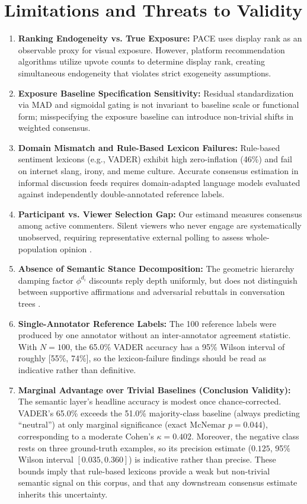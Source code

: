 \documentclass[journal]{IEEEtran}
\begin{document}
\section{Limitations and Threats to Validity}
\begin{enumerate}
    \item \textbf{Ranking Endogeneity vs. True Exposure:} PACE uses display rank as an observable proxy for visual exposure. However, platform recommendation algorithms utilize upvote counts to determine display rank, creating simultaneous endogeneity that violates strict exogeneity assumptions.
    \item \textbf{Exposure Baseline Specification Sensitivity:} Residual standardization via MAD and sigmoidal gating is not invariant to baseline scale or functional form; misspecifying the exposure baseline can introduce non-trivial shifts in weighted consensus.
    \item \textbf{Domain Mismatch and Rule-Based Lexicon Failures:} Rule-based sentiment lexicons (e.g., VADER) exhibit high zero-inflation (46\%) and fail on internet slang, irony, and meme culture. Accurate consensus estimation in informal discussion feeds requires domain-adapted language models evaluated against independently double-annotated reference labels.
    \item \textbf{Participant vs. Viewer Selection Gap:} Our estimand measures consensus among active commenters. Silent viewers who never engage are systematically unobserved, requiring representative external polling to assess whole-population opinion \cite{zhao2025spiral}.
    \item \textbf{Absence of Semantic Stance Decomposition:} The geometric hierarchy damping factor $\phi^{d_i}$ discounts reply depth uniformly, but does not distinguish between supportive affirmations and adversarial rebuttals in conversation trees \cite{zubiaga2016stance}.
    \item \textbf{Single-Annotator Reference Labels:} The 100 reference labels were produced by one annotator without an inter-annotator agreement statistic. With $N = 100$, the 65.0\% VADER accuracy has a 95\% Wilson interval of roughly [55\%, 74\%], so the lexicon-failure findings should be read as indicative rather than definitive.
    \item \textbf{Marginal Advantage over Trivial Baselines (Conclusion Validity):} The semantic layer's headline accuracy is modest once chance-corrected. VADER's 65.0\% exceeds the 51.0\% majority-class baseline (always predicting ``neutral'') at only marginal significance (exact McNemar $p = 0.044$), corresponding to a moderate Cohen's $\kappa = 0.402$. Moreover, the negative class rests on three ground-truth examples, so its precision estimate ($0.125$, 95\% Wilson interval $[0.035, 0.360]$) is indicative rather than precise. These bounds imply that rule-based lexicons provide a weak but non-trivial semantic signal on this corpus, and that any downstream consensus estimate inherits this uncertainty.
\end{enumerate}
\end{document}
